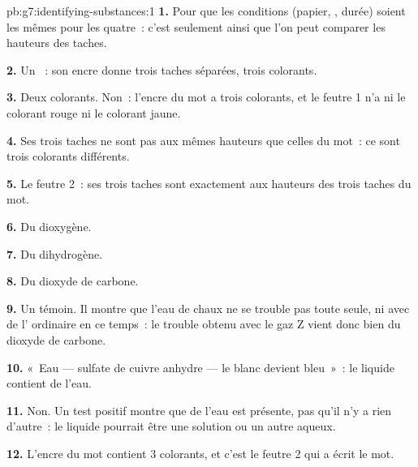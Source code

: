 \begin{solution}{pb:g7:identifying-substances:1}
\textbf{1.} Pour que les conditions (papier, , durée) soient les
mêmes pour les quatre~: c'est seulement ainsi que l'on peut comparer les
hauteurs des taches.

\textbf{2.} Un ~: son encre donne trois taches séparées, trois
colorants.

\textbf{3.} Deux colorants. Non~: l'encre du mot a trois colorants, et
le feutre 1 n'a ni le colorant rouge ni le colorant jaune.

\textbf{4.} Ses trois taches ne sont pas aux mêmes hauteurs que celles
du mot~: ce sont trois colorants différents.

\textbf{5.} Le feutre 2~: ses trois taches sont exactement aux hauteurs
des trois taches du mot.

\textbf{6.} Du dioxygène.

\textbf{7.} Du dihydrogène.

\textbf{8.} Du dioxyde de carbone.

\textbf{9.} Un témoin. Il montre que l'eau de chaux ne se trouble pas
toute seule, ni avec de l' ordinaire en ce temps~: le trouble obtenu
avec le gaz Z vient donc bien du dioxyde de carbone.

\textbf{10.} «~Eau --- sulfate de cuivre anhydre --- le blanc devient
bleu~»~: le liquide contient de l'eau.

\textbf{11.} Non. Un test positif montre que de l'eau est présente, pas
qu'il n'y a rien d'autre~: le liquide pourrait être une solution ou un
autre  aqueux.

\textbf{12.} L'encre du mot contient 3 colorants, et c'est le feutre 2
qui a écrit le mot.
\end{solution}
